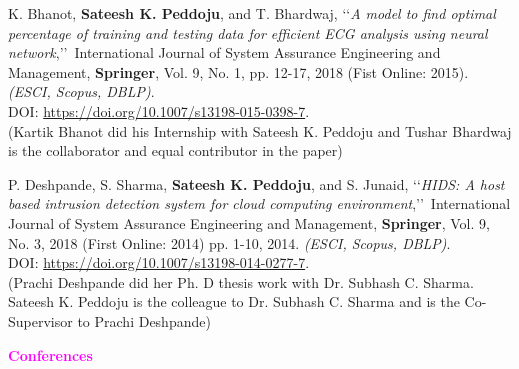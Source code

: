 \begin{etaremune}
	\item
	K. Bhanot, \textbf{Sateesh K. Peddoju}, and T. Bhardwaj, \lq\lq \textit{A model to find optimal percentage of training and testing data for efficient ECG analysis using neural network},\rq\rq\, International Journal of System Assurance Engineering and Management, \textbf{Springer}, Vol. 9, No. 1, pp. 12-17, 2018 (Fist Online: 2015). \emph{(ESCI, Scopus, DBLP)}. \\DOI: \url{https://doi.org/10.1007/s13198-015-0398-7}.
\\ (Kartik Bhanot did his Internship with Sateesh K. Peddoju and Tushar Bhardwaj is the collaborator and equal contributor in the paper)
	
	\item
	P. Deshpande, S. Sharma, \textbf{Sateesh K. Peddoju}, and S. Junaid, \lq\lq \textit{HIDS: A host based intrusion detection system for cloud computing environment},\rq\rq\, International Journal of System Assurance Engineering and Management, \textbf{Springer}, Vol. 9, No. 3, 2018 (First Online: 2014) pp. 1-10, 2014. \emph{(ESCI, Scopus, DBLP)}. \\DOI: \url{https://doi.org/10.1007/s13198-014-0277-7}.  \\(Prachi Deshpande did her Ph. D thesis work with Dr. Subhash C. Sharma. Sateesh K. Peddoju is the colleague to Dr. Subhash C. Sharma and is the Co-Supervisor to Prachi Deshpande)
	
	
\end{etaremune}

\begin{flushleft}
	{\textbf{\textcolor{magenta}{Conferences}}}
\end{flushleft}

